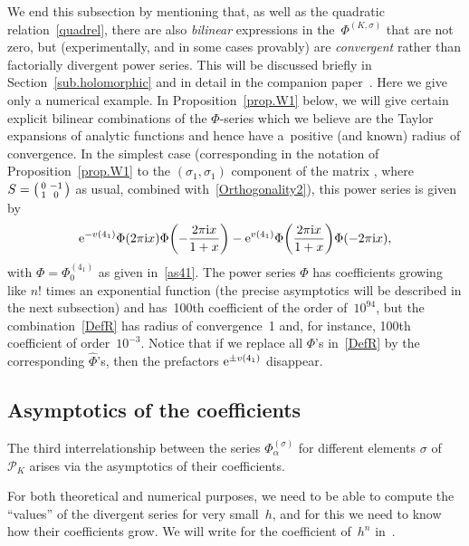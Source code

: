 \documentclass[pdftex]{sigma}
\numberwithin{equation}{section}
\def\calP{\mathcal P}
\def\calP{\mathcal P}
\def\Phih{\widehat\Phi}
\def\a{\alpha}
\def\a{\alpha}
\def\s{\sigma}
\def\sma#1#2#3#4{\bigl(\smallmatrix#1&#2\\#3&#4\endsmallmatrix\bigr)} %
\def\be{\begin{equation}}
\def\ee{\end{equation}}
\begin{document}
We end this subsection by mentioning that, as well as the quadratic
relation~\eqref{quadrel}, there are also \emph{bilinear} expressions in
the~$\Phi^{(K,\s)}$ that are not zero, but (experimentally, and
in some cases provably) are \emph{convergent} rather than factorially divergent
power series. This will be discussed briefly in Section~\ref{sub.holomorphic}
and in detail in the companion paper~\cite{GZ:qseries}. Here we give only a
numerical example. In Proposition~\ref{prop.W1} below, we will give certain explicit
bilinear combinations of the $\Phi$-series which we believe are the Taylor expansions
of analytic functions and hence have a~positive (and known) radius of convergence.
In the simplest case (corresponding in the notation of Proposition~\ref{prop.W1}
to the $(\s_1,\s_1)$ component of the matrix , where
$S=\sma0{-1}10$ as usual, combined with~\eqref{Orthogonality2}), this power series
is given by
\be
\label{DefR}
{\rm e}^{-v(4_1)} \Phi(2 \pi {\rm i} x)\Phi\biggl(-\frac{2 \pi {\rm i} x}{1+x}\biggr)
 - {\rm e}^{v(4_1)} \Phi\biggl(\frac{2 \pi {\rm i} x}{1+x}\biggr)\Phi(-2 \pi {\rm i} x) ,
\ee
with $\Phi=\Phi^{(4_1)}_0$ as given in~\eqref{as41}. The power series $\Phi$
has coefficients growing like $n!$ times an exponential
function (the precise asymptotics will be described in the next subsection)
and has~100th coefficient of the order of~$10^{94}$, but the combination~\eqref{DefR}
has radius of convergence~1 and, for instance, 100th coefficient of
order~$10^{-3}$. Notice that if we replace all $\Phi$'s in~\eqref{DefR}
by the corresponding $\Phih$'s, then the prefactors $ {\rm e}^{\pm v(4_1)}$
disappear.

\subsection{Asymptotics of the coefficients}
\label{sub.CoeffA}

The third interrelationship between the series $\Phi^{(\s)}_\a$ for different
elements $\s$ of~$\calP_K$ arises via the asymptotics of their coefficients.

For both theoretical and numerical purposes, we need to be able to compute
the ``values'' of the divergent series \smash{$\Phi^{(\s)}_\a(h)$} for very small~$h$,
and for this we need to know how their coefficients grow. We will write
\smash{$A^{(\s)}_\a(n)=A^{(K,\s)}_\a(n)$} for the coefficient of~$h^n$
in~\smash{$\Phi^{(K,\s)}_\a(h)$}.
\end{document}
